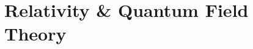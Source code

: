 \documentclass[12pt, a4paper]{report}
\begin{document}
\part{Relativity \& Quantum Field Theory}
% 
% 
% 
% 
% 
% 
% 


% 

% 
% 


\printnomenclature




\printindex
\end{document}
